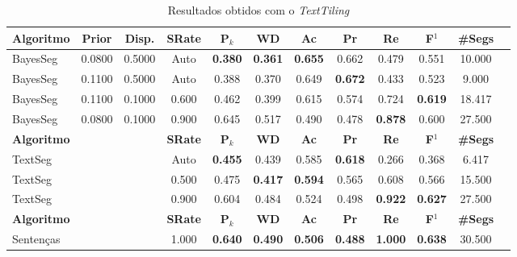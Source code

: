 \begin{table}[!h]
\begin{tabular}{|l||c|c|c|c|c|c|c|c|c|c|c|}
\hline
		\textbf{Algoritmo} &
		\textbf{Prior} &
		\textbf{Disp.} & 
		\textbf{SRate}& 
		\textbf{P$_k$} & 
		\textbf{WD} & 
		\textbf{Ac} & 
		\textbf{Pr} & 
		\textbf{Re} &
		\textbf{F$^1$} &
		\textbf{\#Segs} \\	\hline


 BayesSeg & 0.0800 & 0.5000 &  Auto & \cellcolor{gray!20} \textbf{0.380} & \cellcolor{gray!20} \textbf{0.361} & \cellcolor{gray!20} \textbf{0.655} & 0.662 & 0.479 & 0.551 & 10.000  \\ \hline 
 BayesSeg & 0.1100 & 0.5000 &  Auto & 0.388 & 0.370 & 0.649 & \cellcolor{gray!20} \textbf{0.672} & 0.433 & 0.523 & 9.000  \\ \hline 
 BayesSeg & 0.1100 & 0.1000 & 0.600 & 0.462 & 0.399 & 0.615 & 0.574 & 0.724 & \cellcolor{gray!20} \textbf{0.619} & 18.417  \\ \hline 
 BayesSeg & 0.0800 & 0.1000 & 0.900 & 0.645 & 0.517 & 0.490 & 0.478 & \cellcolor{gray!20} \textbf{0.878} & 0.600 & 27.500  \\ \hline 

\hline
		\textbf{Algoritmo} &&&
		\textbf{SRate} & 
		\textbf{P$_k$} & 
		\textbf{WD} & 
		\textbf{Ac} & 
		\textbf{Pr} & 
		\textbf{Re} &
		\textbf{F$^1$} &
		\textbf{\#Segs} \\	\hline

TextSeg &&& Auto & \cellcolor{gray!20} \textbf{0.455} & 0.439 & 0.585 & \cellcolor{gray!20} \textbf{0.618} & 0.266 & 0.368 & 6.417  \\ \hline 
TextSeg &&& 0.500 & 0.475 & \cellcolor{gray!20} \textbf{0.417} & \cellcolor{gray!20} \textbf{0.594} & 0.565 & 0.608 & 0.566 & 15.500  \\ \hline 
TextSeg &&& 0.900 & 0.604 & 0.484 & 0.524 & 0.498 & \cellcolor{gray!20} \textbf{0.922} & \cellcolor{gray!20} \textbf{0.627} & 27.500  \\ \hline 

\hline
		\textbf{Algoritmo} &&&
		\textbf{SRate} & 
		\textbf{P$_k$} & 
		\textbf{WD} & 
		\textbf{Ac} & 
		\textbf{Pr} & 
		\textbf{Re} &
		\textbf{F$^1$} &
		\textbf{\#Segs} \\	\hline


Sentenças &&& 1.000& \cellcolor{gray!20} \textbf{0.640} & \cellcolor{gray!20} \textbf{0.490} & \cellcolor{gray!20} \textbf{0.506} & \cellcolor{gray!20} \textbf{0.488} & \cellcolor{gray!20} \textbf{1.000} & \cellcolor{gray!20} \textbf{0.638} & 30.500  \\ \hline 



	\end{tabular}
	\caption{Resultados obtidos com o \textit{TextTiling}}
	\label{tab:resultadosTT}
\end{table}





